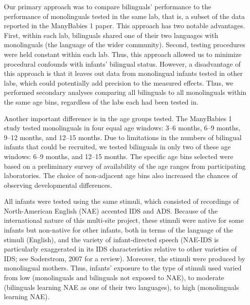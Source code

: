\documentclass[,man,floatsintext]{apa6}
\begin{document}
Our primary approach was to compare bilinguals' performance to the performance of monolinguals tested in the same lab, that is, a subset of the data reported in the ManyBabies 1 paper. This approach has two notable advantages. First, within each lab, bilinguals shared one of their two languages with monolinguals (the language of the wider community). Second, testing procedures were held constant within each lab. Thus, this approach allowed us to minimize procedural confounds with infants' bilingual status. However, a disadvantage of this approach is that it leaves out data from monolingual infants tested in other labs, which could potentially add precision to the measured effects. Thus, we performed secondary analyses comparing all bilinguals to all monolinguals within the same age bins, regardless of the labs each had been tested in.

Another important difference is in the age groups tested. The ManyBabies 1 study tested monolinguals in four equal age windows: 3--6 months, 6--9 months, 9--12 months, and 12--15 months. Due to limitations in the numbers of bilingual infants that could be recruited, we tested bilinguals in only two of these age windows: 6--9 months, and 12--15 months. The specific age bins selected were based on a preliminary survey of availability of the age ranges from participating laboratories. The choice of non-adjacent age bins also increased the chances of observing developmental differences.

All infants were tested using the same stimuli, which consisted of recordings of North-American English (NAE) accented IDS and ADS. Because of the international nature of this multi-site project, these stimuli were native for some infants but non-native for other infants, both in terms of the language of the stimuli (English), and the variety of infant-directed speech (NAE-IDS is particularly exaggerated in its IDS characteristics relative to other varieties of IDS; see Soderstrom, 2007 for a review). Moreover, the stimuli were produced by monolingual mothers. Thus, infants' exposure to the type of stimuli used varied from low (monolinguals and bilinguals not exposed to NAE), to moderate (bilinguals learning NAE as one of their two languages), to high (monolinguals learning NAE).
\end{document}
